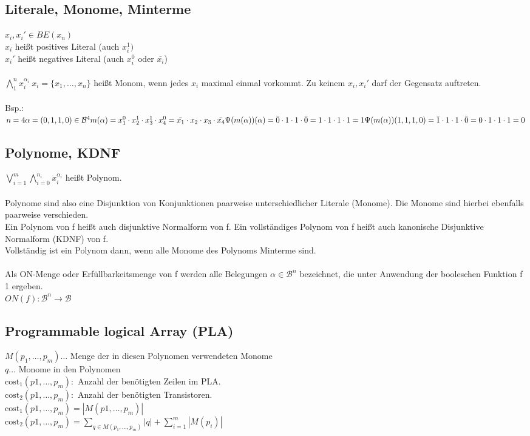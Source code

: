 \documentclass{scrartcl}[10pt]
\begin{document}
\subsection{Literale, Monome, Minterme}
$x_i, x_i' \in BE(x_n)$\\
$x_i$ hei\ss t positives Literal (auch $x_i^1)$\\
$x_i'$ hei\ss t negatives Literal (auch $x_i^0 \text{ oder } \bar{x_i}$)\\ \\
$\bigwedge_1^n{x_i^{\alpha_i}} \ x_i = \{x_1,\dots, x_n\}$ hei\ss t Monom, wenn jedes $x_i$ maximal einmal vorkommt. Zu keinem $x_i, x_i'$ darf der Gegensatz auftreten.\\ \\
Bsp.: \ \ $n = 4 \alpha= (0, 1, 1, 0) \in \mathcal{B}^4\\
m(\alpha) = x_1^0 \cdot x_2^1 \cdot x_3^1 \cdot x_4^0 = \bar{x_1} \cdot x_2 \cdot x_3 \cdot \bar{x_4}\\
\Psi(m(\alpha))(\alpha) = \bar{0} \cdot 1 \cdot 1 \cdot \bar{0} = 1 \cdot 1 \cdot 1 \cdot 1 = 1\\
\Psi(m(\alpha))(1, 1, 1, 0) = \bar{1} \cdot 1\cdot 1 \cdot \bar{0} = 0 \cdot 1 \cdot 1 \cdot 1 = 0$\\
\subsection{Polynome, KDNF}
$\bigvee_{i=1}^m \bigwedge_{i=0}^{n_i}{x_i^{\alpha_i}}$ hei\ss t Polynom.\\ \\
Polynome sind also eine Disjunktion von Konjunktionen paarweise unterschiedlicher Literale (Monome). Die Monome sind hierbei ebenfalls paarweise verschieden.\\
Ein Polynom von f hei\ss t auch disjunktive Normalform von f. Ein vollst\"andiges Polynom von f hei\ss t auch kanonische Disjunktive Normalform (KDNF) von f. \\
Vollst\"andig ist ein Polynom dann, wenn alle Monome des Polynoms Minterme sind. \\ \\
Als ON-Menge oder Erf\"ullbarkeitsmenge von f werden alle Belegungen $\alpha \in \mathcal{B}^n$ bezeichnet, die unter Anwendung der booleschen Funktion f 1 ergeben.\\
$ON(f): \mathcal{B}^n \rightarrow \mathcal{B}$\\
\subsection{Programmable logical Array (PLA)}
$M(p_1,\dots,p_m) \dots$ Menge der in diesen Polynomen verwendeten Monome\\
$q \dots $ Monome in den Polynomen\\
$\text{cost}_1(p1, \dots, p_m):$ Anzahl der ben\"otigten Zeilen im PLA.\\
$\text{cost}_2(p1, \dots, p_m):$ Anzahl der ben\"otigten Transistoren.\\
$\text{cost}_1(p1, \dots, p_m) = |M(p1, \dots, p_m) |$ \\
$\text{cost}_2(p1, \dots, p_m) = \sum_{q\in M(p_1, \dots, p_m)}^{}|q| + \sum_{i=1}^{m}{|M(p_i)|}$
\end{document}
